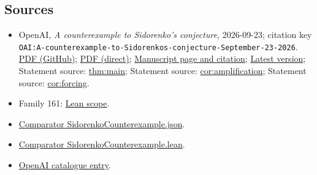 \documentclass[11pt]{article}
\begin{document}
\subsection{Sources}
\begin{itemize}
\item OpenAI, \emph{A counterexample to Sidorenko's conjecture}, 2026-09-23; citation key \texttt{OAI:A-counterexample-to-Sidorenkos-conjecture-September-23-2026}. \href{https://github.com/openai/math/blob/adc7f1241b42e322a6451854ab7e4b4c146bf78a/preprints/A-counterexample-to-Sidorenkos-conjecture-September-23-2026/paper.pdf}{PDF (GitHub)}; \href{https://github.com/openai/math/raw/adc7f1241b42e322a6451854ab7e4b4c146bf78a/preprints/A-counterexample-to-Sidorenkos-conjecture-September-23-2026/paper.pdf}{PDF (direct)}; \href{https://github.com/openai/math/blob/adc7f1241b42e322a6451854ab7e4b4c146bf78a/preprints/A-counterexample-to-Sidorenkos-conjecture-September-23-2026/README.md}{Manuscript page and citation}; \href{https://github.com/openai/math/blob/main/preprints/A-counterexample-to-Sidorenkos-conjecture-September-23-2026/paper.pdf}{Latest version}; Statement source: \href{https://github.com/openai/math/blob/adc7f1241b42e322a6451854ab7e4b4c146bf78a/preprints/A-counterexample-to-Sidorenkos-conjecture-September-23-2026/build/sections/introduction.tex\#L18}{thm:main}; Statement source: \href{https://github.com/openai/math/blob/adc7f1241b42e322a6451854ab7e4b4c146bf78a/preprints/A-counterexample-to-Sidorenkos-conjecture-September-23-2026/build/sections/introduction.tex\#L279}{cor:amplification}; Statement source: \href{https://github.com/openai/math/blob/adc7f1241b42e322a6451854ab7e4b4c146bf78a/preprints/A-counterexample-to-Sidorenkos-conjecture-September-23-2026/build/sections/introduction.tex\#L335}{cor:forcing}.
\item Family 161: \href{https://github.com/openai/math/blob/adc7f1241b42e322a6451854ab7e4b4c146bf78a/lean/docs/161.md}{Lean scope}.
\item \href{https://github.com/openai/math/blob/adc7f1241b42e322a6451854ab7e4b4c146bf78a/lean/ComparatorChallenges/SidorenkoCounterexample.json}{Comparator SidorenkoCounterexample.json}.
\item \href{https://github.com/openai/math/blob/adc7f1241b42e322a6451854ab7e4b4c146bf78a/lean/ComparatorChallenges/SidorenkoCounterexample.lean}{Comparator SidorenkoCounterexample.lean}.
\item \href{https://github.com/openai/math/blob/adc7f1241b42e322a6451854ab7e4b4c146bf78a/CONTENTS.md}{OpenAI catalogue entry}.
\end{itemize}
\end{document}
